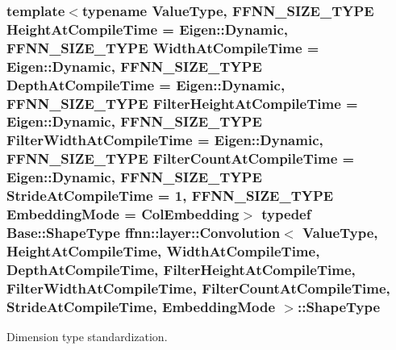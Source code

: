 \hypertarget{classffnn_1_1layer_1_1_convolution_a94fd4842bb6fd40c64b4aa52a39f450a}{
\subsubsection[{Shape\-Type}]{\setlength{\rightskip}{0pt plus 5cm}template$<$typename Value\-Type, F\-F\-N\-N\-\_\-\-S\-I\-Z\-E\-\_\-\-T\-Y\-P\-E Height\-At\-Compile\-Time = Eigen\-::\-Dynamic, F\-F\-N\-N\-\_\-\-S\-I\-Z\-E\-\_\-\-T\-Y\-P\-E Width\-At\-Compile\-Time = Eigen\-::\-Dynamic, F\-F\-N\-N\-\_\-\-S\-I\-Z\-E\-\_\-\-T\-Y\-P\-E Depth\-At\-Compile\-Time = Eigen\-::\-Dynamic, F\-F\-N\-N\-\_\-\-S\-I\-Z\-E\-\_\-\-T\-Y\-P\-E Filter\-Height\-At\-Compile\-Time = Eigen\-::\-Dynamic, F\-F\-N\-N\-\_\-\-S\-I\-Z\-E\-\_\-\-T\-Y\-P\-E Filter\-Width\-At\-Compile\-Time = Eigen\-::\-Dynamic, F\-F\-N\-N\-\_\-\-S\-I\-Z\-E\-\_\-\-T\-Y\-P\-E Filter\-Count\-At\-Compile\-Time = Eigen\-::\-Dynamic, F\-F\-N\-N\-\_\-\-S\-I\-Z\-E\-\_\-\-T\-Y\-P\-E Stride\-At\-Compile\-Time = 1, F\-F\-N\-N\-\_\-\-S\-I\-Z\-E\-\_\-\-T\-Y\-P\-E Embedding\-Mode = Col\-Embedding$>$ typedef Base\-::\-Shape\-Type {\bf ffnn\-::layer\-::\-Convolution}$<$ Value\-Type, Height\-At\-Compile\-Time, Width\-At\-Compile\-Time, Depth\-At\-Compile\-Time, Filter\-Height\-At\-Compile\-Time, Filter\-Width\-At\-Compile\-Time, Filter\-Count\-At\-Compile\-Time, Stride\-At\-Compile\-Time, {\bf Embedding\-Mode} $>$\-::{\bf Shape\-Type}}}\label{classffnn_1_1layer_1_1_convolution_a94fd4842bb6fd40c64b4aa52a39f450a}


Dimension type standardization. 

